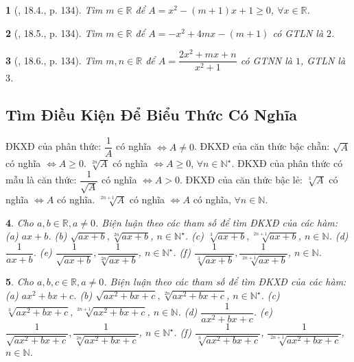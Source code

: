 \documentclass{article}
\newtheorem{baitoan}{}
\begin{document}
\begin{baitoan}[\cite{TLCT_THCS_Toan_9_dai_so}, 18.4., p. 134]
	Tìm $m\in\mathbb{R}$ để $A = x^2 - (m + 1)x + 1\ge0$, $\forall x\in\mathbb{R}$.
\end{baitoan}

\begin{baitoan}[\cite{TLCT_THCS_Toan_9_dai_so}, 18.5., p. 134]
	Tìm $m\in\mathbb{R}$ để $A = -x^2 + 4mx - (m + 1)$ có {\rm GTLN} là $2$.
\end{baitoan}

\begin{baitoan}[\cite{TLCT_THCS_Toan_9_dai_so}, 18.6., p. 134]
	Tìm $m,n\in\mathbb{R}$ để $A = \dfrac{2x^2 + mx + n}{x^2 + 1}$ có {\rm GTNN} là $1$, {\rm GTLN} là $3$.
\end{baitoan}

\subsection{Tìm Điều Kiện Để Biểu Thức Có Nghĩa}
 {\sf ĐKXĐ của phân thức}: $\dfrac{1}{A}$ có nghĩa $\Leftrightarrow A\ne0$.  {\sf ĐKXĐ của căn thức bậc chẵn}: $\sqrt{A}$ có nghĩa $\Leftrightarrow A\ge0$. $\sqrt[2n]{A}$ có nghĩa $\Leftrightarrow A\ge0$, $\forall n\in\mathbb{N}^\star$.  {\sf ĐKXĐ của phân thức có mẫu là căn thức}: $\dfrac{1}{\sqrt{A}}$ có nghĩa $\Leftrightarrow A > 0$.  {\sf ĐKXĐ của căn thức bậc lẻ}: $\sqrt[3]{A}$ có nghĩa $\Leftrightarrow A$ có nghĩa. $\sqrt[2n + 1]{A}$ có nghĩa $\Leftrightarrow A$ có nghĩa, $\forall n\in\mathbb{N}$.

\begin{baitoan}
	Cho $a,b\in\mathbb{R},a\ne0$. Biện luận theo các tham số để tìm {\rm ĐKXĐ} của các hàm: (a) $ax + b$. (b) $\sqrt{ax + b},\sqrt[2n]{ax + b}$, $n\in\mathbb{N}^\star$. (c) $\sqrt[3]{ax + b},\sqrt[2n + 1]{ax + b}$, $n\in\mathbb{N}$. (d) $\dfrac{1}{ax + b}$. (e) $\dfrac{1}{\sqrt{ax + b}},\dfrac{1}{\sqrt[2n]{ax + b}}$, $n\in\mathbb{N}^\star$. (f) $\dfrac{1}{\sqrt[3]{ax + b}},\dfrac{1}{\sqrt[2n+1]{ax + b}}$, $n\in\mathbb{N}$.
\end{baitoan}

\begin{baitoan}
	Cho $a,b,c\in\mathbb{R},a\ne0$. Biện luận theo các tham số để tìm {\rm ĐKXĐ} của các hàm: (a) $ax^2 + bx + c$. (b) $\sqrt{ax^2 + bx + c},\sqrt[2n]{ax^2 + bx + c}$, $n\in\mathbb{N}^\star$. (c) $\sqrt[3]{ax^2 + bx + c},\sqrt[2n + 1]{ax^2 + bx + c}$, $n\in\mathbb{N}$. (d) $\dfrac{1}{ax^2 + bx + c}$. (e) $\dfrac{1}{\sqrt{ax^2 + bx + c}},\dfrac{1}{\sqrt[2n]{ax^2 + bx + c}}$, $n\in\mathbb{N}^\star$. (f) $\dfrac{1}{\sqrt[3]{ax^2 + bx + c}}$, $\dfrac{1}{\sqrt[2n+1]{ax^2 + bx + c}}$, $n\in\mathbb{N}$.
\end{baitoan}
\end{document}
